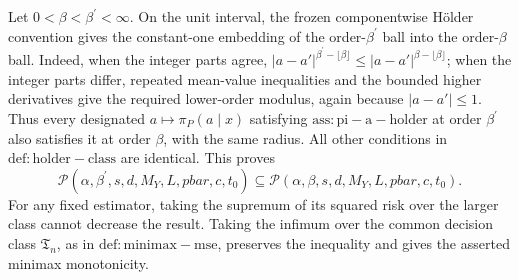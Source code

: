 Let \(0<\beta<\beta^{\prime}<\infty\).  On the unit interval, the frozen componentwise Hölder convention gives the constant-one embedding of the order-\(\beta^{\prime}\) ball into the order-\(\beta\) ball.  Indeed, when the integer parts agree, \(|a-a'|^{\beta^{\prime}-\lfloor\beta\rfloor}\le |a-a'|^{\beta-\lfloor\beta\rfloor}\); when the integer parts differ, repeated mean-value inequalities and the bounded higher derivatives give the required lower-order modulus, again because \(|a-a'|\le1\).  Thus every designated \(a\mapsto\pi_P(a\mid x)\) satisfying \(\mathrm{ass:pi-a-holder}\) at order \(\beta^{\prime}\) also satisfies it at order \(\beta\), with the same radius.  All other conditions in \(\mathrm{def:holder-class}\) are identical.  This proves
\[
\mathcal P(\alpha,\beta^{\prime},s,d,M_Y,L,pbar,c,t_0)
\subseteq
\mathcal P(\alpha,\beta,s,d,M_Y,L,pbar,c,t_0).
\]
For any fixed estimator, taking the supremum of its squared risk over the larger class cannot decrease the result.  Taking the infimum over the common decision class \(\mathfrak T_n\), as in \(\mathrm{def:minimax-mse}\), preserves the inequality and gives the asserted minimax monotonicity.